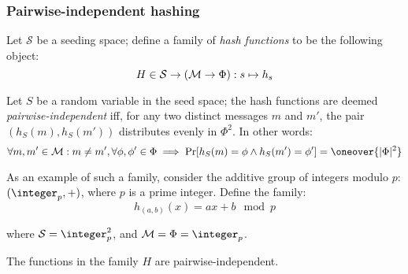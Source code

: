 \subsubsection{Pairwise-independent hashing}

\begin{definition}
    Let $\mathcal{S}$ be a seeding space; define a family of \emph{hash functions} to be the following object\footnotemark:
    \[
        H \in \mathcal{S} \to (\mathcal{M} \to \Phi) : s \mapsto h_s
    \]


    Let $S$ be a random variable in the seed space; the hash functions are deemed \emph{pairwise-independent}\footnotemark{} iff, for any two distinct messages $m$ and $m'$, the pair $(h_S(m), h_S(m'))$ distributes evenly in $\Phi^2$. In other words:
    \[
        \forall m, m' \in \M : m \neq m', \forall \phi, \phi' \in \Phi \implies \Pr[h_S(m) = \phi \wedge h_S(m') = \phi'] = \oneover{|\Phi|^2}
    \]
\end{definition}


As an example of such a family, consider the additive group of integers modulo $p$: $(\integer_p, +)$, where $p$ is a prime integer. Define the family:
\[
    h_{(a, b)}(x) = ax + b \mod p
\]

where $\mathcal{S} = \integer_p^2$, and $\M = \Phi = \integer_p$. 

\begin{theorem}
    The functions in the family $H$ are pairwise-independent.
\end{theorem}

